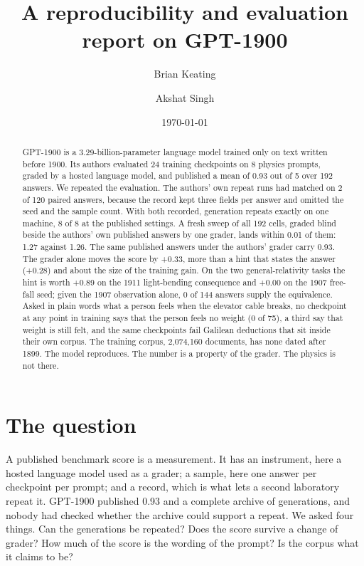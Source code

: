 \documentclass[reprint,prx,amsmath,amssymb,aps,superscriptaddress]{revtex4-2}
\begin{document}
\title{A reproducibility and evaluation report on GPT-1900}
\author{Brian Keating}
\author{Akshat Singh}
\date{\today}

\begin{abstract}
GPT-1900 is a 3.29-billion-parameter language model trained only on text written before 1900. Its authors evaluated 24 training checkpoints on 8 physics prompts, graded by a hosted language model, and published a mean of 0.93 out of 5 over 192 answers. We repeated the evaluation. The authors' own repeat runs had matched on 2 of 120 paired answers, because the record kept three fields per answer and omitted the seed and the sample count. With both recorded, generation repeats exactly on one machine, 8 of 8 at the published settings. A fresh sweep of all 192 cells, graded blind beside the authors' own published answers by one grader, lands within 0.01 of them: 1.27 against 1.26. The same published answers under the authors' grader carry 0.93. The grader alone moves the score by +0.33, more than a hint that states the answer (+0.28) and about the size of the training gain. On the two general-relativity tasks the hint is worth +0.89 on the 1911 light-bending consequence and +0.00 on the 1907 free-fall seed; given the 1907 observation alone, 0 of 144 answers supply the equivalence. Asked in plain words what a person feels when the elevator cable breaks, no checkpoint at any point in training says that the person feels no weight (0 of 75), a third say that weight is still felt, and the same checkpoints fail Galilean deductions that sit inside their own corpus. The training corpus, 2,074,160 documents, has none dated after 1899. The model reproduces. The number is a property of the grader. The physics is not there.
\end{abstract}

\maketitle

\section{The question}

A published benchmark score is a measurement. It has an instrument, here a hosted language model used as a grader; a sample, here one answer per checkpoint per prompt; and a record, which is what lets a second laboratory repeat it. GPT-1900 \cite{ref1} published 0.93 and a complete archive of generations, and nobody had checked whether the archive could support a repeat. We asked four things. Can the generations be repeated? Does the score survive a change of grader? How much of the score is the wording of the prompt? Is the corpus what it claims to be?
\end{document}
